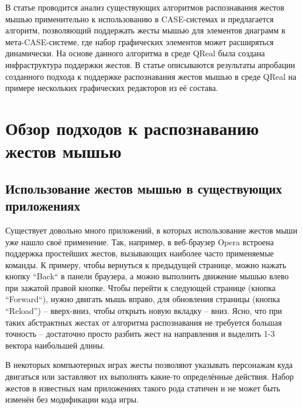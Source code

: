 \documentclass[a5paper]{article}
\begin{document}
В статье проводится анализ существующих алгоритмов распознавания жестов мышью применительно к использованию в CASE-системах и предлагается алгоритм, позволяющий поддержать жесты мышью для элементов диаграмм в мета-CASE-системе, где набор графических элементов может расширяться динамически. На основе данного алгоритма в среде QReal была создана инфраструктура поддержки жестов.  В статье описываются результаты апробации созданного подхода к поддержке распознавания жестов мышью в среде QReal на примере нескольких графических редакторов из её состава. 

\section{Обзор подходов к распознаванию жестов мышью}

\subsection{Использование жестов мышью в существующих приложениях}

Существует довольно много приложений, в которых использование жестов мыши уже нашло своё применение. Так, например, в веб-браузер Opera встроена поддержка простейших жестов, вызывающих наиболее часто применяемые команды. К примеру, чтобы вернуться к предыдущей странице, можно нажать кнопку ``Back`` в панели браузера, а можно выполнить движение мышью влево при зажатой правой кнопке. Чтобы перейти к следующей странице (кнопка ``Forward``), нужно двигать мышь вправо, для обновления страницы (кнопка ``Reload'') -- вверх-вниз, чтобы открыть новую вкладку -- вниз. Ясно, что при таких абстрактных жестах от алгоритма распознавания не требуется большая точность -- достаточно просто разбить жест на направления и выделить 1-3 вектора наибольшей длины.

В некоторых компьютерных играх жесты позволяют указывать персонажам куда двигаться или заставляют их выполнять какие-то определённые действия. Набор жестов в известных нам приложениях такого рода статичен и не может быть изменён без модификации кода игры.
\end{document}
